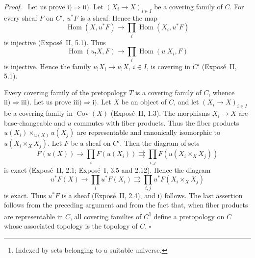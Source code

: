 \documentclass[11pt]{article}
\newcommand{\Hom}{\operatorname{Hom}}
\newcommand{\Cov}{\operatorname{Cov}}
\newcommand{\qedtext}{\hfill\(\square\)}
\newenvironment{prooftext}{\par\noindent\emph{Proof.}\ }{\par\medskip}
\begin{document}
\begin{prooftext}
Let us prove \(\mathrm{i)}\Rightarrow\mathrm{ii)}\). Let \((X_i\to X)_{i\in I}\) be a covering family of \(C\). For every sheaf \(F\) on \(C'\), \(u^{\ast}F\) is a sheaf. Hence the map
\[
\Hom(X,u^{\ast}F)\longrightarrow\prod_i\Hom(X_i,u^{\ast}F)
\]
is injective (Expos\'e~II, 5.1). Thus
\[
\Hom(u_!X,F)\longrightarrow\prod_i\Hom(u_!X_i,F)
\]
is injective. Hence the family \(u_!X_i\to u_!X\), \(i\in I\), is covering in \(C'\) (Expos\'e~II, 5.1).

Every covering family of the pretopology \(T\) is a covering family of \(C\), whence \(\mathrm{ii)}\Rightarrow\mathrm{iii)}\). Let us prove \(\mathrm{iii)}\Rightarrow\mathrm{i)}\). Let \(X\) be an object of \(C\), and let \((X_i\to X)_{i\in I}\) be a covering family in \(\Cov(X)\) (Expos\'e~II, 1.3). The morphisms \(X_i\to X\) are base-changeable and \(u\) commutes with fiber products. Thus the fiber products \(u(X_i)\times_{u(X)}u(X_j)\) are representable and canonically isomorphic to \(u(X_i\times_XX_j)\). Let \(F\) be a sheaf on \(C'\). Then the diagram of sets
\[
F(u(X))\longrightarrow\prod_iF(u(X_i))\rightrightarrows\prod_{i,j}F(u(X_i\times_XX_j))
\]
is exact (Expos\'e~II, 2.1; Expos\'e~I, 3.5 and 2.12). Hence the diagram
\[
u^{\ast}F(X)\longrightarrow\prod_i u^{\ast}F(X_i)\rightrightarrows\prod_{i,j}u^{\ast}F(X_i\times_XX_j)
\]
is exact. Thus \(u^{\ast}F\) is a sheaf (Expos\'e~II, 2.4), and \(\mathrm{i)}\) follows. The last assertion follows from the preceding argument and from the fact that, when fiber products are representable in \(C\), all covering families of \(C\)\footnote{Indexed by sets belonging to a suitable universe.} define a pretopology on \(C\) whose associated topology is the topology of \(C\). \qedtext
\end{prooftext}
\end{document}
